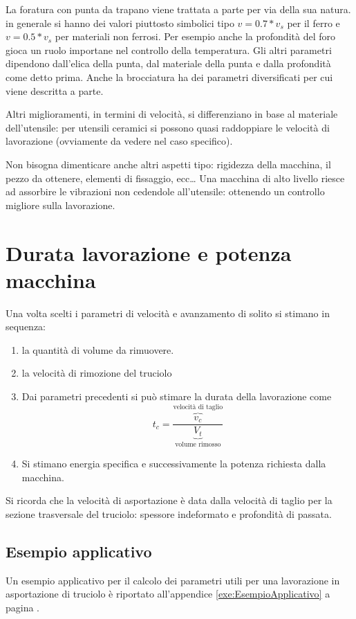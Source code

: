 La foratura con punta da trapano viene trattata a parte per via della sua natura. in generale si hanno dei valori piuttosto simbolici tipo $v = 0.7*v_s$ per il ferro e $v = 0.5*v_s$ per materiali non ferrosi.
Per esempio anche la profondità del foro gioca un ruolo importane nel controllo della temperatura.
Gli altri parametri dipendono dall'elica della punta, dal materiale della punta e dalla profondità come detto prima.
Anche la brocciatura ha dei parametri diversificati per cui viene descritta a parte.

Altri miglioramenti, in termini di velocità, si differenziano in base al materiale dell'utensile: per utensili ceramici si possono quasi raddoppiare le velocità di lavorazione (ovviamente da vedere nel caso specifico).

Non bisogna dimenticare anche altri aspetti tipo: rigidezza della macchina, il pezzo da ottenere, elementi di fissaggio, ecc\dots
Una macchina di alto livello riesce ad assorbire le vibrazioni non cedendole all'utensile: ottenendo un controllo migliore sulla lavorazione.

\section{Durata lavorazione e potenza macchina}
Una volta scelti i parametri di velocità e avanzamento di solito si stimano in sequenza:
\begin{enumerate}
\item la quantità di volume da rimuovere.
\item la velocità di rimozione del truciolo
\item Dai parametri precedenti si può stimare la durata della lavorazione come 
\begin{equation}
t_c = \frac{\overbrace{v_c}^{\text{velocità di taglio}}}{\underbrace{V_t}_{\text{volume rimosso}}}
\end{equation}
\item Si stimano energia specifica e successivamente la potenza richiesta dalla macchina.
\end{enumerate}

Si ricorda che la velocità di asportazione è data dalla velocità di taglio per la sezione trasversale del truciolo: spessore indeformato e profondità di passata.

\subsection{Esempio applicativo}
Un esempio applicativo per il calcolo dei parametri utili per una lavorazione in asportazione di truciolo è riportato all'appendice \ref{exe:EsempioApplicativo} a pagina \pageref{exe:EsempioApplicativo}.

